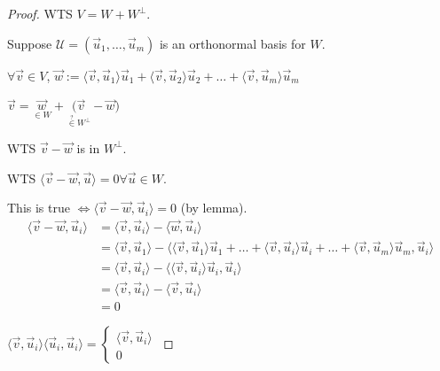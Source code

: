 \documentclass[11pt,fleqn]{book} %
\begin{document}
\begin{proof}
    WTS $V = W + W^\perp$.
    
    Suppose $\mathcal{U} = (\vec{u}_1, \dots, \vec{u}_m)$ is an orthonormal basis for $W$. 

    $\forall \vec{v} \in V$, $\vec{w} := \langle \vec{v}, \vec{u}_1 \rangle\vec{u}_1 + \langle \vec{v}, \vec{u}_2 \rangle\vec{u}_2 + \dots + \langle \vec{v}, \vec{u}_m \rangle\vec{u}_m$

    $\vec{v} = \underset{\in W}{\vec{w}} + \underset{\overset{?}{\in} W^\perp}{(\vec{v}} - \vec{w})$

    WTS $\vec{v} - \vec{w}$ is in $W^\perp$. 

    WTS $\langle \vec{v} - \vec{w}, \vec{u} \rangle = 0 \forall \vec{u} \in W$.

    This is true $\iff \langle \vec{v} - \vec{w}, \vec{u}_i \rangle = 0$ (by lemma). 
    \begin{align*}
        \langle \vec{v} - \vec{w}, \vec{u}_i \rangle
        &= \langle \vec{v}, \vec{u}_i \rangle - \langle \vec{w}, \vec{u}_i \rangle
        \\
        &= \langle \vec{v}, \vec{u}_1 \rangle - \langle \langle \vec{v}, \vec{u}_1 \rangle\vec{u}_1 + \dots + \langle \vec{v}, \vec{u}_i \rangle\vec{u}_i + \dots + \langle \vec{v}, \vec{u}_m \rangle \vec{u}_m, \vec{u}_i \rangle
        \\
        &= \langle \vec{v}, \vec{u}_i \rangle - \langle \langle \vec{v}, \vec{u}_i \rangle \vec{u}_i, \vec{u}_i \rangle 
        \\
        &= \langle \vec{v}, \vec{u}_i \rangle - \langle \vec{v}, \vec{u}_i \rangle 
        \\
        &= 0
    \end{align*}

$\langle \vec{v}, \vec{u}_i \rangle \langle \vec{u}_i, \vec{u}_i \rangle = \begin{cases} \langle \vec{v}, \vec{u}_i \rangle \\ 0  \end{cases}
$
\end{proof}
\end{document}
